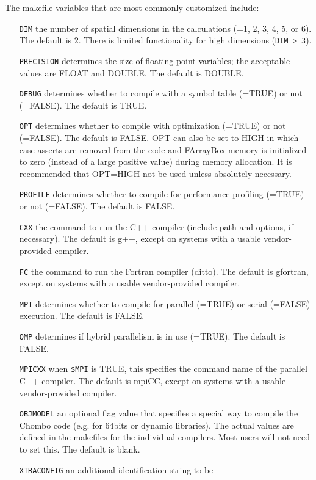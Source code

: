 The makefile variables that are most commonly customized include:
\begin{itemize}
\item[\tt DIM] the number of spatial dimensions in the calculations
  (=1, 2, 3, 4, 5, or 6).  The default is 2. There is limited
  functionality for high dimensions ({\tt DIM > 3}).  
\item[\tt PRECISION] determines the size of floating point variables; the
  acceptable values are FLOAT and DOUBLE.  The default is DOUBLE.
\item[\tt DEBUG] determines whether to compile with a symbol table (=TRUE) or
  not (=FALSE).  The default is TRUE.
\item[\tt OPT] determines whether to compile with optimization (=TRUE) or
  not (=FALSE).  The default is FALSE.  OPT can also be set to HIGH in which
  case asserts are removed from the code and FArrayBox memory is initialized
  to zero (instead of a large positive value) during memory allocation.  It is
  recommended that OPT=HIGH not be used unless absolutely necessary.
\item[\tt PROFILE] determines whether to compile for performance profiling
  (=TRUE) or not (=FALSE).  The default is FALSE.
\item[\tt CXX] the command to run the C++ compiler (include path and options, if necessary).  
  The default is g++, except on systems with a usable vendor-provided compiler.
\item[\tt FC] the command to run the Fortran compiler (ditto).
  The default is gfortran, except on systems with a usable vendor-provided compiler.
\item[\tt MPI] determines whether to compile for parallel (=TRUE) or serial
  (=FALSE) execution.  The default is FALSE.
\item[\tt OMP] determines if hybrid parallelism is in use (=TRUE). The
  default is FALSE.
\item[\tt MPICXX] when {\tt \$MPI} is TRUE, this specifies the command name 
  of the parallel C++ compiler.  The default is mpiCC, except on systems with
  a usable vendor-provided compiler.
\item[\tt OBJMODEL] an optional flag value that specifies a special way to
  compile the Chombo code (e.g. for 64bits or dynamic libraries).  The actual
  values are defined in the makefiles for the individual compilers. Most users
  will not need to set this.  The default is blank.
\item[\tt XTRACONFIG] an additional identification string to be

\end{itemize}

